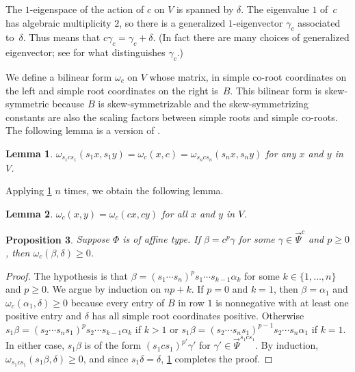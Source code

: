 \documentclass{amsart}
\newtheorem{proposition}{Proposition}[section]
\newtheorem{lemma}[proposition]{Lemma}
\theoremstyle{definition}
\theoremstyle{remark}
\numberwithin{equation}{section}
\newcommand{\set}[1]{{\lbrace #1 \rbrace}}
\newcommand{\0}{{\mathbf{0}}}
\newcommand{\RSChar}{\Phi}
\newcommand{\RS}{\RSChar}
\newcommand{\TravInfChar}{\Psi}
\newcommand{\TravProj}[1]{\overrightarrow{\TravInfChar}^{#1}}
\begin{document}
The $1$-eigenspace of the action of $c$ on $V$ is spanned by $\delta$.
The eigenvalue $1$ of~$c$ has algebraic multiplicity $2$, so there is a generalized $1$-eigenvector $\gamma_c$ associated to~$\delta$.
Thus means that $c\gamma_c=\gamma_c+\delta$.
(In fact there are many choices of generalized eigenvector; see \cite[Proposition~3.1]{afforb} for what distinguishes $\gamma_c$.)

We define a bilinear form $\omega_c$ on $V$ whose matrix, in simple co-root coordinates on the left and simple root coordinates on the right is~$B$.
This bilinear form is skew-symmetric because $B$ is skew-symmetrizable and the skew-symmetrizing constants are also the scaling factors between simple roots and simple co-roots.
The following lemma is a version of \cite[Lemma~3.8]{typefree}.

\begin{lemma}\label{omega s}
$\omega_{s_1cs_1}(s_1x,s_1y)=\omega_c(x,c)=\omega_{s_ncs_n}(s_nx,s_ny)$ for any $x$ and $y$ in~$V$.
\end{lemma}

Applying \cref{omega s} $n$ times, we obtain the following lemma.

\begin{lemma}\label{omega c}
$\omega_c(x,y)=\omega_c(cx,cy)$ for all $x$ and $y$ in $V$.
\end{lemma}

\begin{proposition}\label{om del}
Suppose $\RS$ is of affine type.
If $\beta=c^p\gamma$ for some $\gamma\in\TravProj{c}$ and $p\ge0$, then $\omega_c(\beta,\delta)\ge0$. 
\end{proposition}
\begin{proof}
The hypothesis is that $\beta=(s_1\cdots s_n)^ps_1\cdots s_{k-1}\alpha_k$ for some $k\in\set{1,\ldots,n}$ and $p\ge0$.
We argue by induction on $np+k$.
If $p=0$ and $k=1$, then $\beta=\alpha_1$ and $\omega_c(\alpha_1,\delta)\ge0$ because every entry of $B$ in row $1$ is nonnegative with at least one positive entry and $\delta$ has all simple root coordinates positive.
Otherwise $s_1\beta=(s_2\cdots s_ns_1)^ps_2\cdots s_{k-1}\alpha_k$ if $k>1$ or $s_1\beta=(s_2\cdots s_ns_1)^{p-1}s_2\cdots s_n\alpha_1$ if $k=1$.
In either case, $s_1\beta$ is of the form $(s_1cs_1)^{p'}\gamma'$ for $\gamma'\in\TravProj{s_1cs_1}$.
By induction, $\omega_{s_1cs_1}(s_1\beta,\delta)\ge0$, and since $s_1\delta=\delta$, \cref{omega s} completes the proof.
\end{proof}
\end{document}

